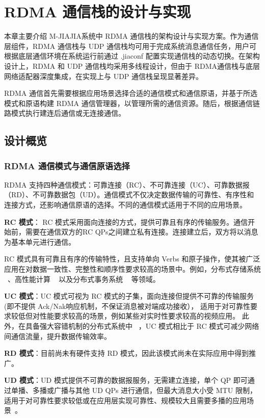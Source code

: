 \chapter{RDMA 通信栈的设计与实现}\label{chap:RJIAJIA}{
    本章主要介绍 M-JIAJIA系统中 RDMA 通信栈的架构设计与实现方案。作为通信层组件，RDMA 通信栈与 UDP 通信栈均可用于完成系统消息通信任务，用户可根据底层通信环境在系统运行前通过 .jiaconf 配置实现通信栈的动态切换。在架构设计上，RDMA 和 UDP 通信栈均采用多线程设计，但由于 RDMA通信栈与底层网络适配器深度集成，在实现上与 UDP 通信栈呈现显著差异。

    RDMA 通信首先需要根据应用场景选择合适的通信模式和通信原语，并基于所选模式和原语构建 RDMA 通信管理器，以管理所需的通信资源。随后，根据通信链路模式执行建连后通信或无连接通信。

    \section{设计概览}

    \subsection{RDMA 通信模式与通信原语选择}
    RDMA 支持四种通信模式：可靠连接（RC）、不可靠连接（UC）、可靠数据报（RD）、不可靠数据包（UD）。通信模式不仅决定数据传输的可靠性、有序性和连接方式，还影响通信原语的选择。不同的通信模式适用于不同的应用场景。

    \textbf{RC 模式}： RC 模式采用面向连接的方式，提供可靠且有序的传输服务。通信开始前，需要在通信双方的RC QPs之间建立私有连接。连接建立后，双方将以消息为基本单元进行通信。

    RC 模式具有可靠且有序的传输特性，且支持单向 Verbs 和原子操作，使其被广泛应用在对数据一致性、完整性和顺序性要求较高的场景中。例如，分布式存储系统 ~\citep{christopher2013pilaf, drago2014farm, xingda2020xstore}、高性能计算 ~\citep{graham2005OpenMPI, Huang2006MVAPICH2} 以及分布式事务系统 ~\citep{xingda2018DrTM+H} 等领域。

    \textbf{UC 模式}：UC 模式可视为 RC 模式的子集，面向连接但提供不可靠的传输服务(即不提供 Ack/Nak响应机制，不保证消息被对端成功接收），
    适用于对可靠性要求较低但对性能要求较高的场景，例如某些对实时性要求较高的视频应用。
    此外，在具备强大容错机制的分布式系统中 ~\citep{kalia2014herd}，UC 模式相比于 RC 模式可减少网络间通信流量，提升数据传输效率。

    \textbf{RD 模式}：目前尚未有硬件支持 RD 模式，因此该模式尚未在实际应用中得到推广。

    \textbf{UD 模式}：UD 模式提供不可靠的数据报服务，无需建立连接，单个 QP 即可通过单播、多播或广播与其他 UD QPs 进行通信，但最大消息大小受 MTU 限制，适用于对可靠性要求较低或在应用层实现可靠性、规模较大且需要多播的应用场景~\citep{kalia2014herd,kalia2016fasst}。

}
